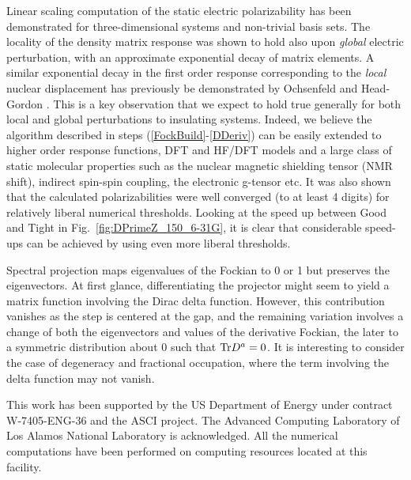\documentclass[prl,aps,twocolumn,showpacs,twocolumngrid,superbib]{revtex4}
\begin{document}
Linear scaling computation of the static electric polarizability has been
demonstrated for three-dimensional systems and non-trivial basis sets. 
The locality of the density matrix response was shown to hold also upon 
{\em global} electric perturbation, with an approximate exponential decay of matrix 
elements. A similar exponential decay in the first order response corresponding to the 
{\em local} nuclear displacement has previously be demonstrated by Ochsenfeld and 
Head-Gordon \cite{Ochsenfeld_1997}.   This is a key observation that we expect to 
hold true generally for both local and global perturbations to insulating systems.
Indeed, we believe the algorithm described in steps (\ref{FockBuild}-\ref{DDeriv})
can be easily extended to higher order response functions, DFT and HF/DFT models and 
a large class of static molecular properties \cite{Me} such as the nuclear magnetic 
shielding tensor (NMR shift), indirect spin-spin coupling, the electronic g-tensor etc.
It was also shown that the calculated polarizabilities were well converged (to 
at least 4 digits) for relatively liberal numerical thresholds.  Looking at the
speed up between Good and Tight in Fig.~\ref{fig:DPrimeZ_150_6-31G}, it is clear
that considerable speed-ups can be achieved by using even more liberal thresholds. 

Spectral projection maps eigenvalues of the Fockian to 0 or 1 but preserves the eigenvectors.  At first glance,
differentiating the projector might seem to yield a matrix function involving the Dirac delta function.  However,
this contribution vanishes as the step is centered at the gap, and the remaining variation involves a change of
both the eigenvectors and values of the derivative Fockian, the later to a symmetric distribution about 0 such 
that ${\rm Tr} D^a = 0$. It is interesting to consider the case of degeneracy and fractional occupation, where
the term involving the delta function may not vanish.

 This work has been supported by the US Department of Energy 
 under contract W-7405-ENG-36 and the ASCI project.  
 The Advanced Computing Laboratory of Los 
 Alamos National Laboratory is acknowledged.
 All the numerical computations have been
 performed on computing resources located at this facility.


\end{document}
